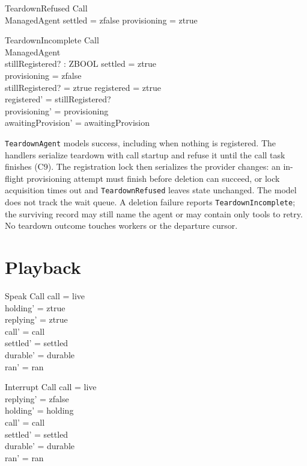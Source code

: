 \documentclass[a4paper,10pt,fleqn]{article}
\begin{document}
\begin{schema}{TeardownRefused}
  \Xi Call \\
  \Xi ManagedAgent
\where
  settled = zfalse \lor provisioning = ztrue
\end{schema}

\begin{schema}{TeardownIncomplete}
  \Xi Call \\
  \Delta ManagedAgent \\
  stillRegistered? : ZBOOL
\where
  settled = ztrue \\
  provisioning = zfalse \\
  stillRegistered? = ztrue \implies registered = ztrue \\
  registered' = stillRegistered? \\
  provisioning' = provisioning \\
  awaitingProvision' = awaitingProvision
\end{schema}

\texttt{TeardownAgent} models success, including when nothing is registered.
The handlers serialize teardown with call startup and refuse it until the
call task finishes (C9). The registration lock then serializes the provider
changes: an in-flight provisioning attempt must finish before deletion can
succeed, or lock acquisition times out and \texttt{TeardownRefused} leaves
state unchanged. The model does not track the wait queue. A deletion
failure reports \texttt{TeardownIncomplete}; the surviving record may still
name the agent or may contain only tools to retry. No teardown outcome
touches workers or the departure cursor.

\section{Playback}

\begin{schema}{Speak}
  \Delta Call
\where
  call = live \\
  holding' = ztrue \\
  replying' = ztrue \\
  call' = call \\
  settled' = settled \\
  durable' = durable \\
  ran' = ran
\end{schema}

\begin{schema}{Interrupt}
  \Delta Call
\where
  call = live \\
  replying' = zfalse \\
  holding' = holding \\
  call' = call \\
  settled' = settled \\
  durable' = durable \\
  ran' = ran
\end{schema}
\end{document}
